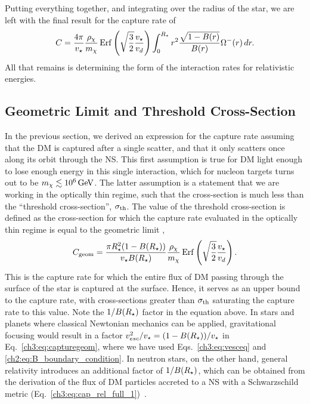 Putting everything together, and integrating over the radius of the star, we are left with the final result for the capture rate of
\begin{equation}
    C =\frac{4\pi}{v_\star}\frac{\rho_\chi}{m_\chi} {\rm \,Erf}\left(\sqrt{\frac{3}{2}}\frac{v_\star}{v_d}\right) \int_0^{R_\star}  r^2\frac{\sqrt{1 - B(r)}}{B(r)}\Omega^-(r)\,dr.
    \label{ch3:eq:cap_rel_full_1}
\end{equation}
All that remains is determining the form of the interaction rates for relativistic energies.


\subsection{Geometric Limit and Threshold Cross-Section}
\label{ch3:subsec:geom_lim_threshold_xs}

In the previous section, we derived an expression for the capture rate assuming that the DM is captured after a single scatter, and that it only scatters once along its orbit through the NS. This first assumption is true for DM light enough to lose enough energy in this single interaction, which for nucleon targets turns out to be $m_\chi\lesssim 10^6{\rm \,GeV}$. The latter assumption is a statement that we are working in the optically thin regime, such that the cross-section is much less than the ``threshold cross-section'', $\sigma_{\rm th}$. The value of the threshold cross-section is defined as the cross-section for which the capture rate evaluated in the optically thin regime is equal to the geometric limit \cite{Bell:2018pkk_sep_HeatingNeutronStars},  
%
\begin{equation}
C_\mathrm{geom} =  \frac{\pi R_\star^2(1-B(R_\star))}{v_\star B(R_\star)} \frac{\rho_\chi}{m_\chi} {\rm \,Erf}\left(\sqrt{\frac{3}{2}}\frac{v_\star}{v_d}\right).
\label{ch3:eq:capturegeom}
\end{equation}
% 
This is the capture rate for which the entire flux of DM passing through the surface of the star is captured at the surface. Hence, it serves as an upper bound to the capture rate, with cross-sections greater than $\sigma_{\rm th}$ saturating the capture rate to this value.
Note the $1/B(R_\star)$ factor in the equation above. In stars and planets where classical Newtonian mechanics can be applied, gravitational focusing would result in a factor  $v_{esc}^2/v_\star =  (1-B(R_\star))/v_\star$ in Eq.~\ref{ch3:eq:capturegeom}, where we have used Eqs.~\ref{ch3:eq:vesceq} and \ref{ch2:eq:B_boundary_condition}. 
In neutron stars, on the other hand, general relativity introduces an additional factor of $1/B(R_\star)$, which can be obtained from the derivation of the flux of DM particles accreted to a NS with a Schwarzschild metric (Eq.~\ref{ch3:eq:cap_rel_full_1})~\cite{Goldman:1989nd_WeaklyInteractingMassive,Kouvaris:2007ay_WIMPAnnihilationCooling}.

